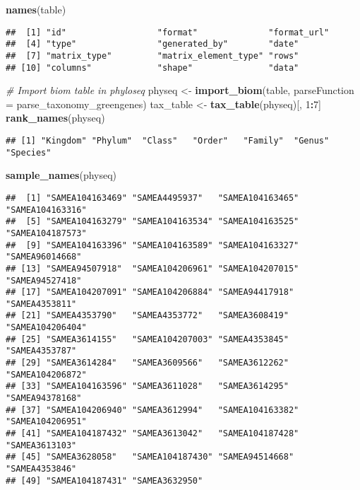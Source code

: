 \documentclass[]{article}
\newenvironment{Shaded}{\begin{snugshade}}{\end{snugshade}}
\newcommand{\CommentTok}[1]{\textcolor[rgb]{0.56,0.35,0.01}{\textit{#1}}}
\newcommand{\DataTypeTok}[1]{\textcolor[rgb]{0.13,0.29,0.53}{#1}}
\newcommand{\DecValTok}[1]{\textcolor[rgb]{0.00,0.00,0.81}{#1}}
\newcommand{\KeywordTok}[1]{\textcolor[rgb]{0.13,0.29,0.53}{\textbf{#1}}}
\newcommand{\NormalTok}[1]{#1}
\newcommand{\OperatorTok}[1]{\textcolor[rgb]{0.81,0.36,0.00}{\textbf{#1}}}
\newcommand{\StringTok}[1]{\textcolor[rgb]{0.31,0.60,0.02}{#1}}
\begin{document}
\begin{Shaded}
\begin{Highlighting}[]
\KeywordTok{names}\NormalTok{(table)}
\end{Highlighting}
\end{Shaded}

\begin{verbatim}
##  [1] "id"                  "format"              "format_url"         
##  [4] "type"                "generated_by"        "date"               
##  [7] "matrix_type"         "matrix_element_type" "rows"               
## [10] "columns"             "shape"               "data"
\end{verbatim}

\begin{Shaded}
\begin{Highlighting}[]
\CommentTok{# Import biom table in phyloseq}
\NormalTok{physeq <-}\StringTok{ }\KeywordTok{import_biom}\NormalTok{(table, }\DataTypeTok{parseFunction =}\NormalTok{ parse_taxonomy_greengenes)}
\NormalTok{tax_table <-}\StringTok{ }\KeywordTok{tax_table}\NormalTok{(physeq)[, }\DecValTok{1}\OperatorTok{:}\DecValTok{7}\NormalTok{]}
\KeywordTok{rank_names}\NormalTok{(physeq)}
\end{Highlighting}
\end{Shaded}

\begin{verbatim}
## [1] "Kingdom" "Phylum"  "Class"   "Order"   "Family"  "Genus"   "Species"
\end{verbatim}

\begin{Shaded}
\begin{Highlighting}[]
\KeywordTok{sample_names}\NormalTok{(physeq)}
\end{Highlighting}
\end{Shaded}

\begin{verbatim}
##  [1] "SAMEA104163469" "SAMEA4495937"   "SAMEA104163465" "SAMEA104163316"
##  [5] "SAMEA104163279" "SAMEA104163534" "SAMEA104163525" "SAMEA104187573"
##  [9] "SAMEA104163396" "SAMEA104163589" "SAMEA104163327" "SAMEA96014668" 
## [13] "SAMEA94507918"  "SAMEA104206961" "SAMEA104207015" "SAMEA94527418" 
## [17] "SAMEA104207091" "SAMEA104206884" "SAMEA94417918"  "SAMEA4353811"  
## [21] "SAMEA4353790"   "SAMEA4353772"   "SAMEA3608419"   "SAMEA104206404"
## [25] "SAMEA3614155"   "SAMEA104207003" "SAMEA4353845"   "SAMEA4353787"  
## [29] "SAMEA3614284"   "SAMEA3609566"   "SAMEA3612262"   "SAMEA104206872"
## [33] "SAMEA104163596" "SAMEA3611028"   "SAMEA3614295"   "SAMEA94378168" 
## [37] "SAMEA104206940" "SAMEA3612994"   "SAMEA104163382" "SAMEA104206951"
## [41] "SAMEA104187432" "SAMEA3613042"   "SAMEA104187428" "SAMEA3613103"  
## [45] "SAMEA3628058"   "SAMEA104187430" "SAMEA94514668"  "SAMEA4353846"  
## [49] "SAMEA104187431" "SAMEA3632950"
\end{verbatim}
\end{document}
